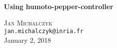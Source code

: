 \begin{titlepage}
\begin{center}

{\huge \bfseries Using humoto-pepper-controller}

\vspace{2cm} 

\textsc{Jan Michalczyk} \\

\texttt{jan.michalczyk@inria.fr} \\[2cm] 

{January 2, 2018}

\vspace{2cm} 

\end{center}
\end{titlepage}
